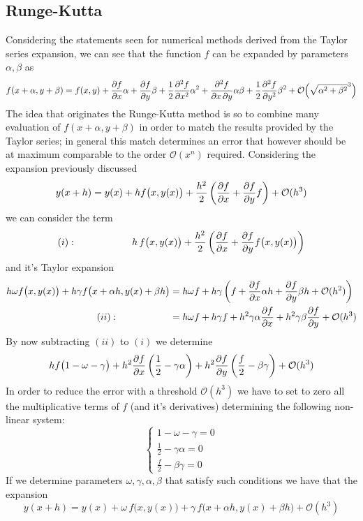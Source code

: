 	\subsection{Runge-Kutta}
		Considering the statements seen for numerical methods derived from the Taylor series expansion, we can see that the function $f$ can be expanded by parameters $\alpha,\beta$ as
		\[ f(x+\alpha, y+\beta) = f(x,y) + \frac{\partial f}{\partial x} \alpha + \frac{\partial f}{\partial y} \beta + \frac 1 2 \frac{\partial ^2f}{\partial x^2}\alpha^2 + \frac{\partial ^2f}{\partial x\, \partial y} \alpha \beta + \frac 1 2 \frac{\partial ^2f}{\partial y^2} \beta^2 + \mathcal O \Big(\sqrt{\alpha^2+\beta^2}^3 \Big)\]
		The idea that originates the Runge-Kutta method is so to combine many evaluation of $f(x+\alpha,y+\beta)$ in order to match the results provided by the Taylor series; in general this match determines an error that however should be at maximum comparable to the order $\mathcal O(x^n)$ required. Considering the expansion previously discussed
		\[ y(x+h) = y(x) + h f\big(x,y(x)\big) + \frac{h^2}{2} \left(\frac{\partial f}{\partial x} + \frac{\partial f}{\partial y} f \right) + \mathcal O(h^3)  \]
		we can consider the term
		\[ (i): \hspace{2cm} h\, f\big(x,y(x)\big) + \frac{h^2} 2 \left( \frac{\partial f}{\partial x} + \frac{\partial f}{\partial y} f\big(x,y(x)\big) \right) \]
		and it's Taylor expansion
		\begin{align*}
			h\omega f\big(x,y(x)\big) + h\gamma f\big(x+\alpha h, y(x) + \beta h\big) & = h\omega f + h\gamma \left( f + \frac{\partial f}{\partial x} \alpha h + \frac{\partial f}{\partial y} \beta h + \mathcal O(h^2) \right) \\
			(ii): \hspace{2cm} & = h\omega f + h\gamma f + h^2 \gamma \alpha \frac{\partial f}{\partial x} + h^2 \gamma \beta \frac{\partial f}{\partial y} + \mathcal O(h^3)
		\end{align*}
		By now subtracting $(ii)$ to $(i)$ we determine
		\[ h f \big(1-\omega - \gamma \big) + h^2 \frac{\partial f}{\partial x} \left( \frac 1 2 - \gamma \alpha \right) + h^2 \frac{\partial f}{\partial y} \left( \frac f 2 - \beta \gamma \right) + \mathcal O(h^3) \]
		In order to reduce the error with a threshold $\mathcal O(h^3)$ we have to set to zero all the multiplicative terms of $f$ (and it's derivatives) determining the following non-linear system:
		\[ \begin{cases}
			1 - \omega - \gamma = 0 \\ \frac 1 2 - \gamma \alpha = 0 \\ \frac f 2 - \beta \gamma = 0
		\end{cases} \]
		If we determine parameters $\omega,\gamma,\alpha,\beta$ that satisfy such conditions we have that the expansion
		\[ y(x+h) = y(x) + \omega \, f\big(x,y(x)\big) + \gamma\, f\big(x+ \alpha h, y(x)+ \beta h \big) + \mathcal O(h^3) \]
